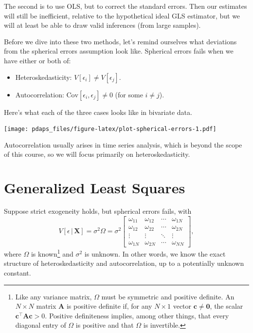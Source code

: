 \documentclass[12pt,oneside,openany]{book}
\begin{document}
The second is to use OLS, but to correct the standard errors. Then our
estimates will still be inefficient, relative to the hypothetical ideal
GLS estimator, but we will at least be able to draw valid inferences
(from large samples).

Before we dive into these two methods, let's remind ourselves what
deviations from the spherical errors assumption look like. Spherical
errors fails when we have either or both of:

\begin{itemize}
\item
  Heteroskedasticity: \(V[\epsilon_i] \neq V[\epsilon_j]\).
\item
  Autocorrelation: \(\text{Cov}[\epsilon_i, \epsilon_j] \neq 0\) (for
  some \(i \neq j\)).
\end{itemize}

Here's what each of the three cases looks like in bivariate data.

\texttt{[image: pdaps\_files/figure-latex/plot-spherical-errors-1.pdf]}

Autocorrelation usually arises in time series analysis, which is beyond
the scope of this course, so we will focus primarily on
heteroskedasticity.

\section{Generalized Least Squares}\label{generalized-least-squares}

Suppose strict exogeneity holds, but spherical errors fails, with \[
V[\epsilon \,|\, \mathbf{X}]
= \sigma^2 \Omega
= \sigma^2 \begin{bmatrix}
  \omega_{11} & \omega_{12} & \cdots & \omega_{1N} \\
  \omega_{12} & \omega_{22} & \cdots & \omega_{2N} \\
  \vdots & \vdots & \ddots & \vdots \\
  \omega_{1N} & \omega_{2N} & \cdots & \omega_{NN}
\end{bmatrix},
\] where \(\Omega\) is known\footnote{Like any variance matrix,
  \(\Omega\) must be symmetric and positive definite. An \(N \times N\)
  matrix \(\mathbf{A}\) is positive definite if, for any \(N \times 1\)
  vector \(\mathbf{c} \neq \mathbf{0}\), the scalar
  \(\mathbf{c}^\top \mathbf{A} \mathbf{c} > 0\). Positive definiteness
  implies, among other things, that every diagonal entry of \(\Omega\)
  is positive and that \(\Omega\) is invertible.} and \(\sigma^2\) is
unknown. In other words, we know the exact structure of
heteroskedasticity and autocorrelation, up to a potentially unknown
constant.
\end{document}
